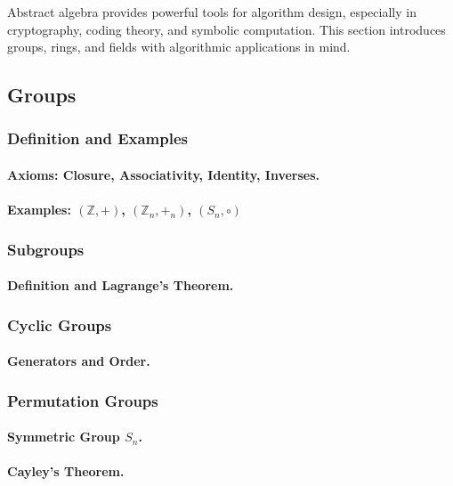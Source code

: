 \begin{sectionintro}
Abstract algebra provides powerful tools for algorithm design, especially in 
cryptography, coding theory, and symbolic computation. This section introduces 
groups, rings, and fields with algorithmic applications in mind.
\end{sectionintro}

\subsection{Groups}
\label{subsec:groups}

\subsubsection{Definition and Examples}
\paragraph{Axioms: Closure, Associativity, Identity, Inverses.}
\paragraph{Examples: $(\mathbb{Z}, +)$, $(\mathbb{Z}_n, +_n)$, $(S_n, \circ)$}

\subsubsection{Subgroups}
\paragraph{Definition and Lagrange's Theorem.}

\subsubsection{Cyclic Groups}
\paragraph{Generators and Order.}

\subsubsection{Permutation Groups}
\paragraph{Symmetric Group $S_n$.}
\paragraph{Cayley's Theorem.}


